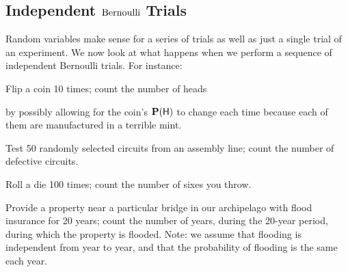 \subsection{Independent $\mbox{{\rm Bernoulli}}$ Trials}

Random variables make sense for a series of trials as well as just a single trial of an experiment.  
We now look at  what happens when we perform a sequence of independent Bernoulli trials.  
For instance:
\bit
\item Flip a coin 10 times; count the  number of heads 
\bit
\item by possibly allowing for the coin's $\mathbf{P}(\mathsf{H})$ to change each time because each of them are manufactured in a terrible mint.
\eit
\item Test 50 randomly selected circuits from an assembly line; count
  the  number of defective circuits.
\item  Roll a die 100 times; count the  number of sixes you throw.
\item Provide a property near a particular bridge in our archipelago with flood insurance
  for 20 years; count the number of years, during the 20-year period,
  during which the property is flooded. Note: we assume that flooding is
  independent from year to year, and that the probability of flooding is the same
  each year.
\eit

